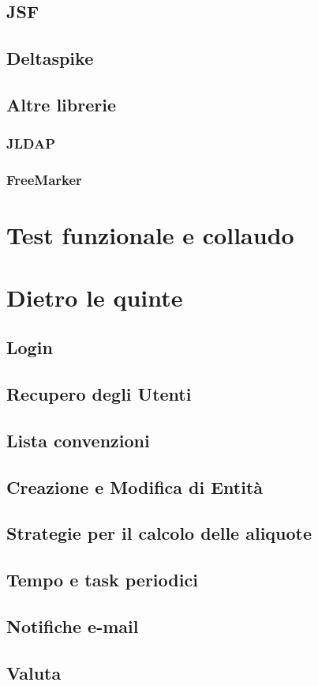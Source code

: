 \documentclass[italian,laurea,twoside,10pt]{UFtesi}
\begin{document}
\section{JSF}
\label{jsf}

\section{Deltaspike}
\label{delta}

\section{Altre librerie}
\label{libs}
\subsection{JLDAP}
\label{jldap}

\subsection{FreeMarker}
\label{freemarker}

\chapter{Test funzionale e collaudo}

\label{howto}
\chapter{Dietro le quinte}
\label{code}
\section{Login}
\label{login}

\section{Recupero degli Utenti}

\section{Lista convenzioni}


\section{Creazione e Modifica di Entità}


\section{Strategie per il calcolo delle aliquote}

\section{Tempo e task periodici}

\section{Notifiche e-mail}

\section{Valuta}


			

\nocite{*}		 %
{}

\end{document}
